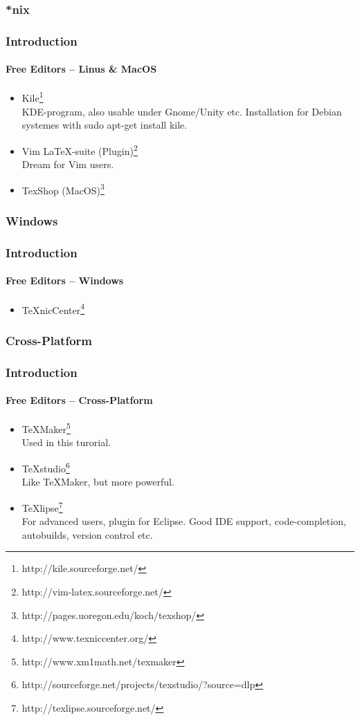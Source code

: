 \subsubsection{*nix}
\begin{frame}
\frametitle{Introduction}
\framesubtitle{Free Editors -- Linus \& MacOS }
\begin{itemize}
 \item Kile\footnote{http://kile.sourceforge.net/}\\KDE-program, also usable under Gnome\slash Unity etc.
 Installation for Debian systemes with {\ttfamily sudo apt-get
 install kile}.
  \item Vim \LaTeX -suite (Plugin)\footnote{http://vim-latex.sourceforge.net/}\\
  Dream for Vim users.
  \item TexShop (MacOS)\footnote{http://pages.uoregon.edu/koch/texshop/}
\end{itemize}
\end{frame}


\subsubsection{Windows}
\begin{frame}
\frametitle{Introduction}
\framesubtitle{Free Editors -- Windows}
\begin{itemize}
\item TeXnicCenter\footnote{http://www.texniccenter.org/}
\end{itemize}
\end{frame}


\subsubsection{Cross-Platform}
\begin{frame}
\frametitle{Introduction}
\framesubtitle{Free Editors -- Cross-Platform}
\begin{itemize}
  \item TeXMaker\footnote{http://www.xm1math.net/texmaker}\\
   Used in this turorial.
  \item TeXstudio\footnote{http://sourceforge.net/projects/texstudio/?source=dlp}\\
  Like TeXMaker, but more powerful.
  \item TeXlipse\footnote{http://texlipse.sourceforge.net/}\\ For advanced users, plugin for
  Eclipse. Good IDE support, code-completion, autobuilds, version control etc.
\end{itemize}
\end{frame}

